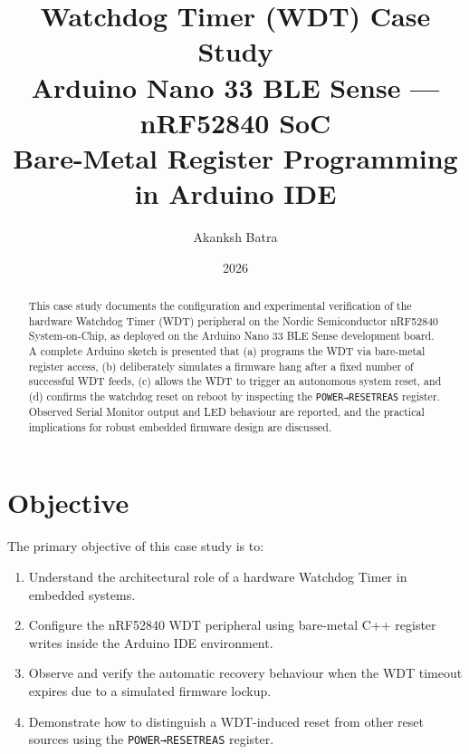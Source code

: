 \documentclass[12pt, a4paper]{article}
\title{%
  \textbf{Watchdog Timer (WDT) Case Study}\\[4pt]
  \large Arduino Nano 33 BLE Sense --- nRF52840 SoC\\[2pt]
  \normalsize Bare-Metal Register Programming in Arduino IDE
}
\author{Akanksh Batra}
\date{2026}
\begin{document}

\maketitle
\thispagestyle{fancy}

\begin{abstract}
This case study documents the configuration and experimental verification of
the hardware Watchdog Timer (WDT) peripheral on the Nordic Semiconductor
nRF52840 System-on-Chip, as deployed on the Arduino Nano 33 BLE Sense
development board. A complete Arduino sketch is presented that (a) programs
the WDT via bare-metal register access, (b) deliberately simulates a firmware
hang after a fixed number of successful WDT feeds, (c) allows the WDT to
trigger an autonomous system reset, and (d) confirms the watchdog reset on
reboot by inspecting the \texttt{POWER→RESETREAS} register. Observed Serial
Monitor output and LED behaviour are reported, and the practical implications
for robust embedded firmware design are discussed.
\end{abstract}

\tableofcontents
\newpage

\section{Objective}

The primary objective of this case study is to:

\begin{enumerate}[label=\arabic*.]
  \item Understand the architectural role of a hardware Watchdog Timer in
        embedded systems.
  \item Configure the nRF52840 WDT peripheral using bare-metal C++ register
        writes inside the Arduino IDE environment.
  \item Observe and verify the automatic recovery behaviour when the WDT timeout
        expires due to a simulated firmware lockup.
  \item Demonstrate how to distinguish a WDT-induced reset from other reset
        sources using the \texttt{POWER→RESETREAS} register.
\end{enumerate}
\end{document}

